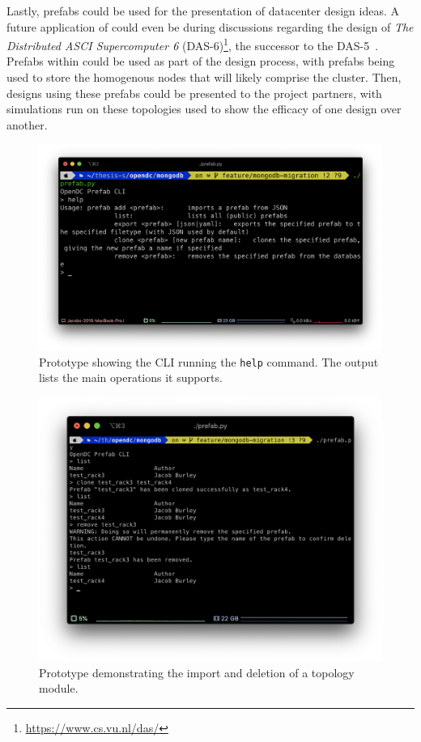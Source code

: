 \documentclass[11pt]{article}
\begin{document}
		Lastly, prefabs could be used for the presentation of datacenter design ideas. 
		A future application of \opendc{} could even be during discussions regarding the design of \textit{The Distributed ASCI Supercomputer 6} (DAS-6)\footnote{\url{https://www.cs.vu.nl/das/}}, the successor to the DAS-5~\cite{Bal2016}.
		Prefabs within \opendc{} could be used as part of the design process, with prefabs being used to store the homogenous nodes that will likely comprise the cluster.
		Then, designs using these prefabs could be presented to the project partners, with simulations run on these topologies used to show the efficacy of one design over another.




\newpage

\begin{figure}[]
	\centering
	\includegraphics[width=\textwidth]{prototype3.png}
	\caption[Prototype showing the CLI operations it supports]{Prototype showing the CLI running the {\tt help} command. The output lists the main operations it supports.}
	\label{fig:prototype1}
\end{figure}
\begin{figure}[t]
	\centering
	\includegraphics[width=\textwidth]{prototype2.png}
	\caption[Prototype demonstrating the import and deletion of a topology module]{Prototype demonstrating the import and deletion of a topology module.}
	\label{fig:prototype2}
\end{figure}
\end{document}
